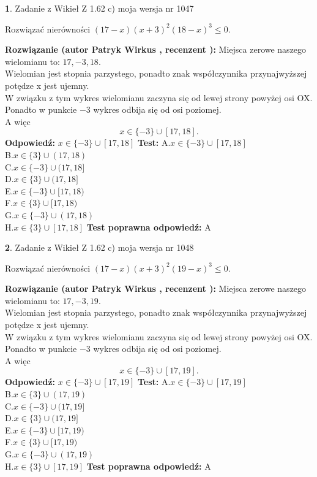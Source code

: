 \documentclass[12pt, a4paper]{article}
\theoremstyle{definition} %
\newtheorem{zad}{}
\newcommand{\zadStart}[1]{\begin{zad}#1\newline}
\newcommand{\zadStop}{\end{zad}}
\newcommand{\rozwStart}[2]{\noindent \textbf{Rozwiązanie (autor #1 , recenzent #2): }\newline}
\newcommand{\rozwStop}{\newline}
\newcommand{\odpStart}{\noindent \textbf{Odpowiedź:}\newline}
\newcommand{\odpStop}{\newline}
\newcommand{\testStart}{\noindent \textbf{Test:}\newline}
\newcommand{\testStop}{\newline}
\newcommand{\kluczStart}{\noindent \textbf{Test poprawna odpowiedź:}\newline}
\newcommand{\kluczStop}{\newline}
\begin{document}
\zadStart{Zadanie z Wikieł Z 1.62 c) moja wersja nr 1047}

Rozwiązać nierówności $(17-x)(x+3)^{2}(18-x)^{3}\le0$.
\zadStop
\rozwStart{Patryk Wirkus}{}
Miejsca zerowe naszego wielomianu to: $17, -3, 18$.\\
Wielomian jest stopnia parzystego, ponadto znak współczynnika przy\linebreak najwyższej potędze x jest ujemny.\\ W związku z tym wykres wielomianu zaczyna się od lewej strony powyżej osi OX.\\
Ponadto w punkcie $-3$ wykres odbija się od osi poziomej.\\
A więc $$x \in \{-3\} \cup [17,18].$$
\rozwStop
\odpStart
$x \in \{-3\} \cup [17,18]$
\odpStop
\testStart
A.$x \in \{-3\} \cup [17,18]$\\
B.$x \in \{3\} \cup (17,18)$\\
C.$x \in \{-3\} \cup (17,18]$\\
D.$x \in \{3\} \cup (17,18]$\\
E.$x \in \{-3\} \cup [17,18)$\\
F.$x \in \{3\} \cup [17,18)$\\
G.$x \in \{-3\} \cup (17,18)$\\
H.$x \in \{3\} \cup [17,18]$
\testStop
\kluczStart
A
\kluczStop



\zadStart{Zadanie z Wikieł Z 1.62 c) moja wersja nr 1048}

Rozwiązać nierówności $(17-x)(x+3)^{2}(19-x)^{3}\le0$.
\zadStop
\rozwStart{Patryk Wirkus}{}
Miejsca zerowe naszego wielomianu to: $17, -3, 19$.\\
Wielomian jest stopnia parzystego, ponadto znak współczynnika przy\linebreak najwyższej potędze x jest ujemny.\\ W związku z tym wykres wielomianu zaczyna się od lewej strony powyżej osi OX.\\
Ponadto w punkcie $-3$ wykres odbija się od osi poziomej.\\
A więc $$x \in \{-3\} \cup [17,19].$$
\rozwStop
\odpStart
$x \in \{-3\} \cup [17,19]$
\odpStop
\testStart
A.$x \in \{-3\} \cup [17,19]$\\
B.$x \in \{3\} \cup (17,19)$\\
C.$x \in \{-3\} \cup (17,19]$\\
D.$x \in \{3\} \cup (17,19]$\\
E.$x \in \{-3\} \cup [17,19)$\\
F.$x \in \{3\} \cup [17,19)$\\
G.$x \in \{-3\} \cup (17,19)$\\
H.$x \in \{3\} \cup [17,19]$
\testStop
\kluczStart
A
\kluczStop
\end{document}
